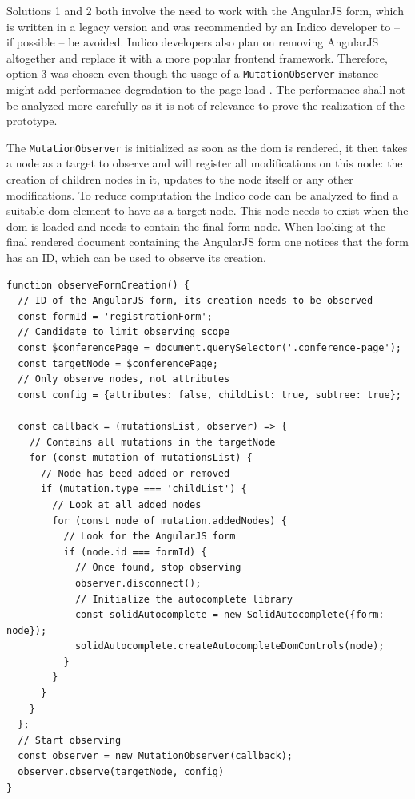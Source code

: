 Solutions 1 and 2 both involve the need to work with the AngularJS form, which is written in a legacy version and was recommended by an Indico developer to -- if possible -- be avoided. Indico developers also plan on removing AngularJS altogether and replace it with a more popular frontend framework. Therefore, option 3 was chosen even though the usage of a \texttt{MutationObserver} instance might add performance degradation to the page load \cite{dom-spec}. The performance shall not be analyzed more carefully as it is not of relevance to prove the realization of the prototype.

The \texttt{MutationObserver} is initialized as soon as the \gls{dom} is rendered, it then takes a node as a target to observe and will register all modifications on this node: the creation of children nodes in it, updates to the node itself or any other modifications. To reduce computation the Indico code can be analyzed to find a suitable \gls{dom} element to have as a target node. This node needs to exist when the \gls{dom} is loaded and needs to contain the final form node. When looking at the final rendered document containing the AngularJS form one notices that the form has an ID, which can be used to observe its creation.
 
\begin{lstlisting}[language=Other,columns=fullflexible, caption={Observe function in Indico}, label={lst:indico-observe}]
function observeFormCreation() {
  // ID of the AngularJS form, its creation needs to be observed
  const formId = 'registrationForm';
  // Candidate to limit observing scope
  const $conferencePage = document.querySelector('.conference-page');
  const targetNode = $conferencePage;
  // Only observe nodes, not attributes
  const config = {attributes: false, childList: true, subtree: true};

  const callback = (mutationsList, observer) => {
    // Contains all mutations in the targetNode
    for (const mutation of mutationsList) {
      // Node has beed added or removed
      if (mutation.type === 'childList') {
        // Look at all added nodes
        for (const node of mutation.addedNodes) {
          // Look for the AngularJS form
          if (node.id === formId) {
            // Once found, stop observing
            observer.disconnect();
            // Initialize the autocomplete library
            const solidAutocomplete = new SolidAutocomplete({form: node});
            solidAutocomplete.createAutocompleteDomControls(node);
          }
        }
      }
    }
  };
  // Start observing
  const observer = new MutationObserver(callback);
  observer.observe(targetNode, config)
}
\end{lstlisting}

